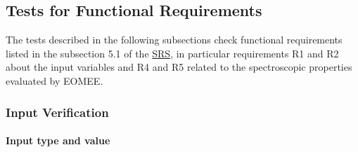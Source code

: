 \documentclass[12pt, titlepage]{article}
\begin{document}
\subsection{Tests for Functional Requirements}

%
The tests described in the following subsections check functional requirements 
listed in the subsection 5.1 of the 
\href{https://github.com/gabrielasd/eomee/tree/cas741/docs/SRS} {SRS}, in 
particular requirements R1 and R2 about the input variables and R4 and R5 
related to the spectroscopic properties evaluated by EOMEE.

\subsubsection{Input Verification}
\label{section:inputs}

		
\paragraph{Input type and value}
\end{document}
